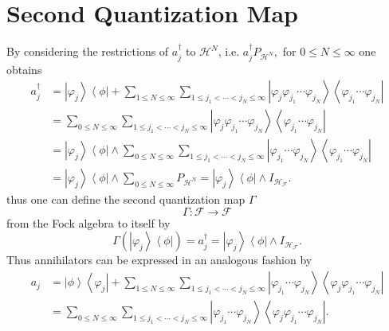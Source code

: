 \documentclass[aps,preprint]{revtex4}%
\begin{document}
\section{Second Quantization Map \label{SecQuant}}

By considering the restrictions of $a_{j}^{\dagger}$ to $\mathcal{H}^{N}$,
i.e. $a_{j}^{\dagger}P_{\mathcal{H}^{N}},$ for $0\leq N\leq\infty$ one obtains%
\begin{align}
a_{j}^{\dagger}  &  =\left\vert \varphi_{j}\right\rangle \left\langle
\phi\right\vert +\sum_{1\leq N\leq\infty}\sum_{1\leq j_{1}<\cdots<j_{N}%
\leq\infty}\left\vert \varphi_{j}\varphi_{j_{1}}\cdots\varphi_{j_{N}%
}\right\rangle \left\langle \varphi_{j_{1}}\cdots\varphi_{j_{N}}\right\vert
\nonumber\\
&  =\sum_{0\leq N\leq\infty}\sum_{1\leq j_{1}<\cdots<j_{N}\leq\infty
}\left\vert \varphi_{j}\varphi_{j_{1}}\cdots\varphi_{j_{N}}\right\rangle
\left\langle \varphi_{j_{1}}\cdots\varphi_{j_{N}}\right\vert \nonumber\\
&  =\left\vert \varphi_{j}\right\rangle \left\langle \phi\right\vert
\wedge\sum_{0\leq N\leq\infty}\sum_{1\leq j_{1}<\cdots<j_{N}\leq\infty
}\left\vert \varphi_{j_{1}}\cdots\varphi_{j_{N}}\right\rangle \left\langle
\varphi_{j_{1}}\cdots\varphi_{j_{N}}\right\vert \nonumber\\
&  =\left\vert \varphi_{j}\right\rangle \left\langle \phi\right\vert
\wedge\sum_{0\leq N\leq\infty}P_{\mathcal{H}^{N}}=\left\vert \varphi
_{j}\right\rangle \left\langle \phi\right\vert \wedge I_{\mathcal{H}%
_{\mathcal{F}}}.
\end{align}
thus one can define the second quantization map $\Gamma$
\begin{equation}
\Gamma:\mathcal{F\rightarrow F}%
\end{equation}
from the Fock algebra to itself by
\begin{equation}
\Gamma\left(  \left\vert \varphi_{j}\right\rangle \left\langle \phi\right\vert
\right)  =a_{j}^{\dagger}=\left\vert \varphi_{j}\right\rangle \left\langle
\phi\right\vert \wedge I_{\mathcal{H}_{\mathcal{F}}}.
\end{equation}
Thus annihilators can be expressed in an analogous fashion by
\begin{align}
a_{j}  &  =\left\vert \phi\right\rangle \left\langle \varphi_{j}\right\vert
+\sum_{1\leq N\leq\infty}\sum_{1\leq j_{1}<\cdots<j_{N}\leq\infty}\left\vert
\varphi_{j_{1}}\cdots\varphi_{j_{N}}\right\rangle \left\langle \varphi
_{j}\varphi_{j_{1}}\cdots\varphi_{j_{N}}\right\vert \nonumber\\
&  =\sum_{0\leq N\leq\infty}\sum_{1\leq j_{1}<\cdots<j_{N}\leq\infty
}\left\vert \varphi_{j_{1}}\cdots\varphi_{j_{N}}\right\rangle \left\langle
\varphi_{j}\varphi_{j_{1}}\cdots\varphi_{j_{N}}\right\vert .
\end{align}
\end{document}
